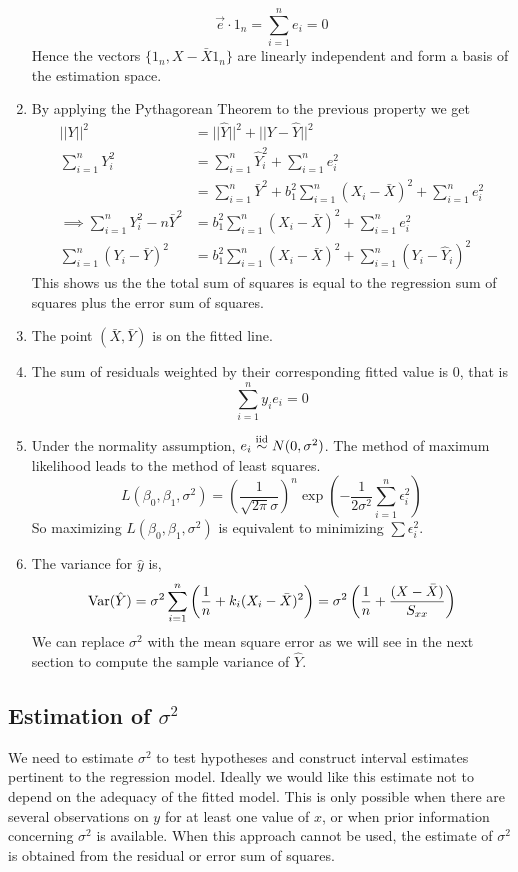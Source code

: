 \begin{enumerate}[label=(\roman*)]
    \[\vec{e} \cdot 1_n = \sum_{i=1}^n e_i = 0\]
    Hence the vectors $\{1_n, X - \bar{X}1_n\}$ are linearly independent and form a basis of the estimation space. 
    \item By applying the Pythagorean Theorem to the previous property we get 
    \begin{align*}
        ||Y||^2 &= ||\hat{Y}||^2 + ||Y-\hat{Y}||^2\\
        \sum_{i=1}^n Y_i^2 &= \sum_{i=1}^n \hat{Y}_i^2 + \sum_{i=1}^n e_i^2\\
        &= \sum_{i=1}^n \bar{Y}^2 + b_1^2\sum_{i=1}^n (X_i - \bar{X})^2 + \sum_{i=1}^n e_i^2\\
        \implies \sum_{i=1}^n Y_i^2 - n\bar{Y}^2 &= b_1^2\sum_{i=1}^n (X_i -\bar{X})^2 + \sum_{i=1}^n e_i^2\\
        \sum_{i=1}^n (Y_i - \bar{Y})^2 &= b_1^2\sum_{i=1}^n (X_i - \bar{X})^2 + \sum_{i=1}^n \left(Y_i - \hat{Y}_i\right)^2     
    \end{align*}
    This shows us the the total sum of squares is equal to the regression sum of squares plus the error sum of squares. 
    \item The point $(\bar{X}, \bar{Y})$ is on the fitted line. 
    \item The sum of residuals weighted by their corresponding fitted value is 0, that is 
    \[\sum_{i=1}^n y_ie_i = 0\]
    \item Under the normality assumption, $e_i \overset{\mathrm{iid}}{\sim} N(0,\sigma^2)$. The method of maximum likelihood leads to the method of least squares.
    \[L(\beta_0, \beta_1,\sigma^2) = \left(\frac{1}{\sqrt{2\pi}\sigma}\right)^n\exp\left(-\frac{1}{2\sigma^2}\sum_{i=1}^n \epsilon_i^2\right)\]
    So maximizing $L(\beta_0,\beta_1, \sigma^2)$ is equivalent to minimizing $\sum \epsilon_i^2$.
    \item The variance for $\hat{y}$ is,
    \[\operatorname{Var}(\hat{Y}) = \sigma^2\sum_{i=1}^n\left(\frac{1}{n} + k_i(X_i - \bar{X})^2\right) = \sigma^2\left(\frac{1}{n} + \frac{(X - \bar{X})}{S_{xx}}\right)\]
    We can replace $\sigma^2$ with the mean square error as we will see in the next section to compute the sample variance of $\hat{Y}$.
\end{enumerate}

 \subsection{Estimation of $\sigma^2$}

 We need to estimate $\sigma^2$ to test hypotheses and construct interval estimates pertinent to the regression model. Ideally we would like this estimate not to depend on the adequacy of the fitted model. This is only possible when there are several observations on $y$ for at least one value of $x$, or when prior information concerning $\sigma^2$ is available. When this approach cannot be used, the estimate of $\sigma^2$ is obtained from the residual or error sum of squares.

